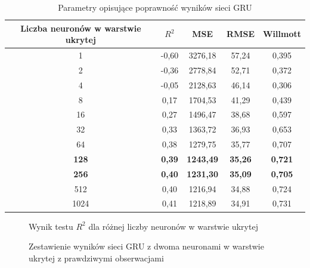 \documentclass[10pt,a4paper]{article}
\begin{document}
\begin{table}[h!]
	\centering
	\begin{tabular}{|c|c|c|c|c|}
		\hline
		Liczba neuronów w warstwie ukrytej & $R^2$ & MSE & RMSE & Willmott \\
		\hline
		1    & -0,60 & 3276,18 & 57,24 & 0,395 \\
		2    & -0,36 & 2778,84 & 52,71 & 0,372 \\
		4    & -0,05 & 2128,63 & 46,14 & 0,306 \\
		8    & 0,17  & 1704,53 & 41,29 & 0,439 \\
		16   & 0,27  & 1496,47 & 38,68 & 0,597 \\
		32   & 0,33  & 1363,72 & 36,93 & 0,653 \\
		64   & 0,38  & 1279,75 & 35,77 & 0,707 \\
		\textbf{128}  & \textbf{0,39}  & \textbf{1243,49} & \textbf{35,26} & \textbf{0,721} \\
		\textbf{256}  & \textbf{0,40}  & \textbf{1231,30} & \textbf{35,09} & \textbf{0,705} \\
		512  & 0,40  & 1216,94 & 34,88 & 0,724 \\
		1024 & 0,41  & 1218,89 & 34,91 & 0,731 \\
		\hline
	\end{tabular}
	\caption{Parametry opisujące poprawność wyników sieci GRU}
	\label{table:gru}
\end{table}
\begin{figure}[!ht]
	\centering
	\caption{Wynik testu $R^2$ dla różnej liczby neuronów w warstwie ukrytej}
	\label{figure:gru_neurons}
\end{figure}
\FloatBarrier
\begin{figure}[!ht]
	\centering
	\caption{Zestawienie wyników sieci GRU z dwoma neuronami w warstwie ukrytej z prawdziwymi obserwacjami}
	\label{figure:gru_2}
\end{figure}
\end{document}
